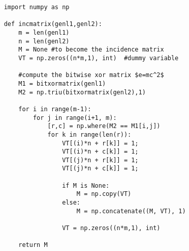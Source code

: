 \begin{verbatim}
	import numpy as np
	     
	def incmatrix(genl1,genl2):
	    m = len(genl1)
	    n = len(genl2)
	    M = None #to become the incidence matrix
	    VT = np.zeros((n*m,1), int)  #dummy variable
	    
	    #compute the bitwise xor matrix $e=mc^2$
	    M1 = bitxormatrix(genl1)
	    M2 = np.triu(bitxormatrix(genl2),1) 
	
	    for i in range(m-1):
	        for j in range(i+1, m):
	            [r,c] = np.where(M2 == M1[i,j])
	            for k in range(len(r)):
	                VT[(i)*n + r[k]] = 1;
	                VT[(i)*n + c[k]] = 1;
	                VT[(j)*n + r[k]] = 1;
	                VT[(j)*n + c[k]] = 1;
	                
	                if M is None:
	                    M = np.copy(VT)
	                else:
	                    M = np.concatenate((M, VT), 1)
	                
	                VT = np.zeros((n*m,1), int)
	    
	    return M
\end{verbatim}


